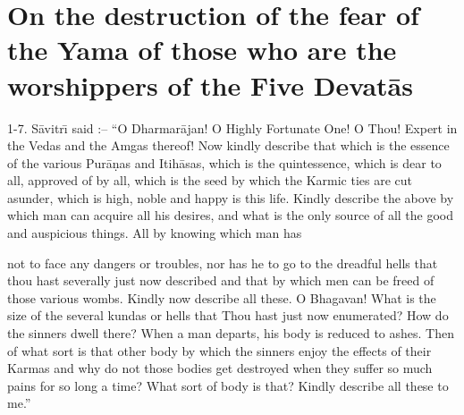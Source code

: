 \chapter{On the destruction of the fear of the Yama of those who are the worshippers of the Five Devat\=as}

1-7. S\=avitr\={\i} said :-- ``O Dharmar\=ajan! O Highly Fortunate One! O Thou! Expert in the Vedas and the Amgas thereof! Now kindly describe that which is the essence of the various Pur\=a\d{n}as and Itih\=asas, which is the quintessence, which is dear to all, approved of by all, which is the seed by which the Karmic ties are cut asunder, which is high, noble and happy is this life. Kindly describe the above by which man can acquire all his desires, and what is the only source of all the good and auspicious things. All by knowing which man has

not to face any dangers or troubles, nor has he to go to the dreadful hells that thou hast severally just now described and that by which men can be freed of those various wombs. Kindly now describe all these. O Bhagavan! What is the size of the several kundas or hells that Thou hast just now enumerated? How do the sinners dwell there? When a man departs, his body is reduced to ashes. Then of what sort is that other body by which the sinners enjoy the effects of their Karmas and why do not those bodies get destroyed when they suffer so much pains for so long a time? What sort of body is that? Kindly describe all these to me.''

